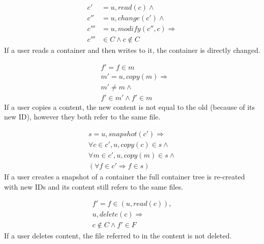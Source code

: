 \documentclass[a4paper,12pt]{article}
\newcommand{\Implies}{\Rightarrow}
\begin{document}
\begin{equation} \label{eq:containerupdate}
    \begin{split}
        c' & = u, read(c) \land \\
        c'' & = u, change(c') \land \\
        c''' & = u, modify(c'', c) \Implies \\
        c''' & \in C \land c \not \in C
    \end{split}
\end{equation}
If a user reads a container and then writes to it, the container is directly changed.

\begin{equation} \label{eq:copy}
    \begin{split}
        & f' = f \in m \\
        & m' = u, copy(m) \Implies \\
        & m' \neq m \land \\
        & f' \in m' \land f' \in m
    \end{split}
\end{equation}
If a user copies a content, the new content is not equal to the old (because of its new ID), however
they both refer to the same file.

\begin{equation} \label{eq:snapshot}
    \begin{split}
        s = u, snapshot(c') \Implies \\
        \forall c \in c', u, copy(c) \in s \land \\
        \forall m \in c', u, copy(m) \in s \land \\
        (\forall f \in c' \Implies f \in s)
    \end{split}
\end{equation}
If a user creates a snapshot of a container the full container tree is re-created with new IDs and
its content still refers to the same files.

\begin{equation} \label{eq:delete}
    \begin{split}
        f' = f \in (u, read(c)),  \\
        u, delete(c) \Implies \\
        c \not \in C \land f' \in F
    \end{split}
\end{equation}
If a user deletes content, the file referred to in the content is not deleted.
\end{document}
